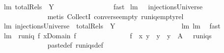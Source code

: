 \begin{isabellebody}
%
\isamarkuptrue%
\isamarkupfalse%
\ lm{}{}{\isacharcolon}\ {\isachardoublequoteopen}totalRels\ {\isacharbraceleft}{\isacharbraceright}\ Y\ {\isacharequal}\ {\isacharbraceleft}{\isacharbraceleft}{\isacharbraceright}{\isacharbraceright}{\isachardoublequoteclose}\ \isanewline
%
\isadelimproof
\ \ \ \ \ \ \ \ \ \ \ \ %
\endisadelimproof
%
\isatagproof
{}\isamarkupfalse%
\ fast%
\endisatagproof
{\isafoldproof}%
%
\isadelimproof
\isanewline
%
\endisadelimproof
\isanewline
{}\isamarkupfalse%
\ lm{}{}{\isacharcolon}\ {\isachardoublequoteopen}{\isacharbraceleft}{\isacharbraceright}\ {\isasymin}\ injectionsUniverse{\isachardoublequoteclose}\ \isanewline
%
\isadelimproof
\ \ \ \ \ \ \ \ \ \ \ \ %
\endisadelimproof
%
\isatagproof
{}\isamarkupfalse%
\ {\isacharparenleft}metis\ CollectI\ converse{\isacharunderscore}empty\ runiq{\isacharunderscore}emptyrel{\isacharparenright}%
\endisatagproof
{\isafoldproof}%
%
\isadelimproof
\isanewline
%
\endisadelimproof
\isanewline
{}\isamarkupfalse%
\ lm{}{}{\isacharcolon}\ {\isachardoublequoteopen}injectionsUniverse\ {\isasyminter}\ {\isacharparenleft}totalRels\ {\isacharbraceleft}{\isacharbraceright}\ Y{\isacharparenright}\ \ {\isacharequal}\ \ {\isacharbraceleft}{\isacharbraceleft}{\isacharbraceright}{\isacharbraceright}{\isachardoublequoteclose}\ \isanewline
%
\isadelimproof
\ \ \ \ \ \ \ \ \ \ \ \ %
\endisadelimproof
%
\isatagproof
{}\isamarkupfalse%
\ lm{}{}\ lm{}{}\ \isamarkupfalse%
\ fast%
\endisatagproof
{\isafoldproof}%
%
\isadelimproof
\isanewline
%
\endisadelimproof
\isanewline
{}\isamarkupfalse%
\ lm{}{}{\isacharcolon}\ \ {\isachardoublequoteopen}runiq\ f{\isachardoublequoteclose}\ {\isachardoublequoteopen}x{\isasymnotin}Domain\ f{\isachardoublequoteclose}\ \isanewline
\ \ \ \ \ \ \ \ \ \ \ \ \ {\isachardoublequoteopen}{\isacharbraceleft}\ f\ {\isasymunion}\ {\isacharbraceleft}{\isacharparenleft}x{\isacharcomma}\ y{\isacharparenright}{\isacharbraceright}\ {\isacharbar}\ y\ {\isachardot}\ y\ {\isasymin}\ A\ {\isacharbraceright}\ {\isasymsubseteq}\ runiqs{\isachardoublequoteclose}\ \isanewline
%
\isadelimproof
\ \ \ \ \ \ \ \ \ \ \ \ %
\endisadelimproof
%
\isatagproof
{}\isamarkupfalse%
\ paste{\isacharunderscore}def\ runiqs{\isacharunderscore}def\isanewline

\end{isabellebody}
